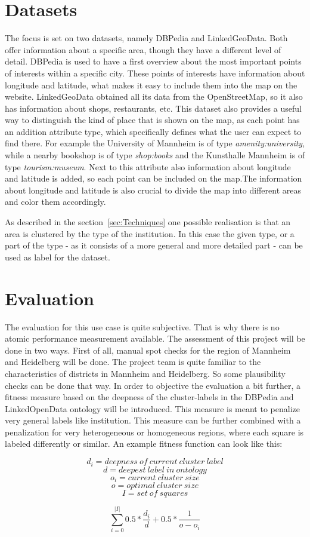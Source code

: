 \section{Datasets}
The focus is set on two datasets, namely DBPedia and LinkedGeoData. Both offer information about a specific area, though they have a different level of detail. DBPedia is used to have a first overview about the most important points of interests within a specific city. These points of interests have information about longitude and latitude, what makes it easy to include them into the map on the website. LinkedGeoData obtained all its data from the OpenStreetMap, so it also has information about shops, restaurants, etc. This dataset also provides a useful way to distinguish the kind of place that is shown on the map, as each point has an addition attribute type, which specifically defines what the user can expect to find there. For example the University of Mannheim is of type \textit{amenity:university}, while a nearby bookshop is of type \textit{shop:books} and the Kunsthalle Mannheim is of type \textit{tourism:museum}. Next to this attribute also information about longitude and latitude is added, so each point can be included on the map.The information about longitude and latitude is also crucial to divide the map into different areas and color them accordingly.

As described in the section~\ref{sec:Techniques} one possible realisation is that an area is clustered by the type of the institution. In this case the given type, or a part of the type - as it consists of a more general and more detailed part - can be used as label for the dataset.

\section{Evaluation}

The evaluation for this use case is quite subjective. That is why there is no atomic performance measurement available. The assessment of this project will be done in two ways. First of all, manual spot checks for the region of Mannheim and Heidelberg will be done. The project team is quite familiar to the characteristics of districts in Mannheim and Heidelberg. So some plausibility checks can be done that way. In order to objective the evaluation a bit further, a fitness measure based on the deepness of the cluster-labels in the DBPedia and LinkedOpenData ontology will be introduced. This measure is meant to penalize very general labels like institution. This measure can be further combined with a penalization for very heterogeneous or homogeneous regions, where each square is labeled differently or similar. An example fitness function can look like this:

\[d_i = deepness~of~current~cluster~label \]
\[d = deepest~label~in~ontology \]
\[o_i = current~cluster~size \]
\[o = optimal~cluster~size \]
\[I = set~of~squares \]

\[\sum_{i=0}^{|I|} 0.5 * \frac{d_i}{d} + 0.5 * \frac{1}{ o - o_i }\]


